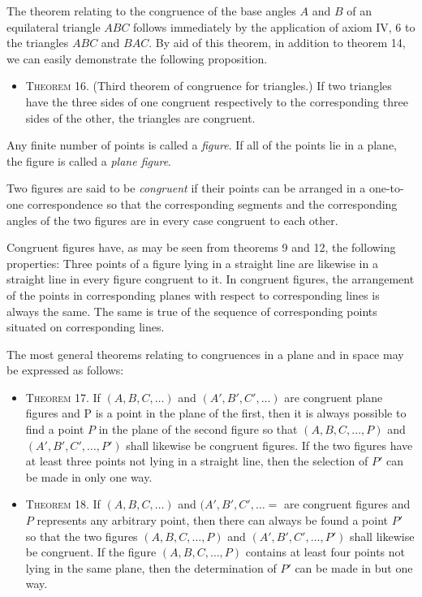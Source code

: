 \documentclass[11pt,oneside]{book}
\begin{document}
The theorem relating to the congruence of the
base angles $A$ and $B$ of an equilateral triangle $ABC$
follows immediately by the application of axiom IV,
6 to the triangles $ABC$ and $BAC$. By aid of this theorem,
in addition to theorem 14, we can easily demonstrate
the following proposition.

\begin{itemize}
\item[]{\scshape Theorem 16.} (Third theorem of congruence for
triangles.) If two triangles have the three sides
of one congruent respectively to the corresponding
three sides of the other, the triangles are
congruent.
\end{itemize}

Any finite number of points is called a \emph{figure}. If
all of the points lie in a plane, the figure is called a
\emph{plane figure}.

Two figures are said to be \emph{congruent} if their points
can be arranged in a one-to-one correspondence so
that the corresponding segments and the corresponding
angles of the two figures are in every case congruent
to each other.

Congruent figures have, as may be seen from theorems
9 and 12, the following properties: Three points
of a figure lying in a straight line are likewise in a
straight line in every figure congruent to it. In congruent
figures, the arrangement of the points in corresponding
planes with respect to corresponding lines
is always the same. The same is true of the sequence
of corresponding points situated on corresponding
lines.

The most general theorems relating to congruences
in a plane and in space may be expressed as follows:
\begin{itemize}
\item[]{\scshape Theorem 17.} If $(A, B, C,\ldots)$ and $(A', B', C',\ldots)$
are congruent plane figures and P is a
point in the plane of the first, then it is always
possible to find a point $P$ in the plane of the
second figure so that $(A, B, C,\ldots , P)$ and $(A', B', C', \ldots , P')$
shall likewise be congruent figures.
If the two figures have at least three
points not lying in a straight line, then the selection
of $P'$ can be made in only one way.

\item[]{\scshape Theorem 18.} If $(A, B, C, \ldots)$ and $(A', B', C',\ldots=$
are congruent figures and $P$ represents
any arbitrary point, then there can always be
found a point $P'$ so that the two figures $(A, B, C, \ldots, P)$
and $(A', B', C', \ldots, P')$ shall
likewise be congruent. If the figure $(A, B, C, \ldots , P)$
contains at least four points not lying
in the same plane, then the determination of
$P'$ can be made in but one way.
\end{itemize}
\end{document}

